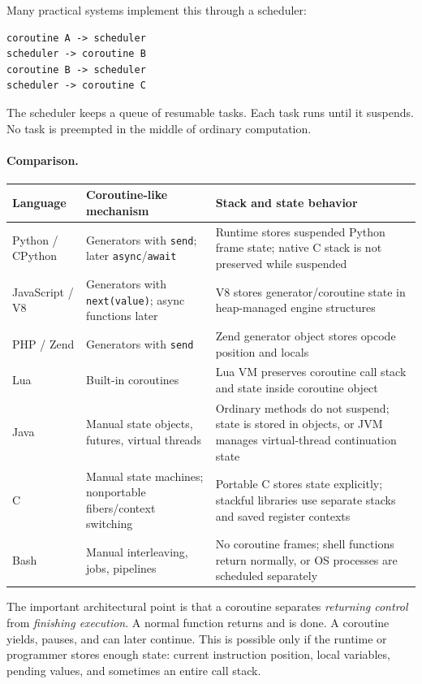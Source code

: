Many practical systems implement this through a scheduler:

\begin{verbatim}
coroutine A -> scheduler
scheduler -> coroutine B
coroutine B -> scheduler
scheduler -> coroutine C
\end{verbatim}

The scheduler keeps a queue of resumable tasks. Each task runs until it suspends. No task is preempted in the middle of ordinary computation.

\paragraph{Comparison.}

\begin{center}
\begin{tabular}{|p{}|p{}|p{}|}
\hline
\textbf{Language} & \textbf{Coroutine-like mechanism} & \textbf{Stack and state behavior} \\
\hline
Python / CPython & Generators with \texttt{send}; later \texttt{async}/\texttt{await} & Runtime stores suspended Python frame state; native C stack is not preserved while suspended \\
\hline
JavaScript / V8 & Generators with \texttt{next(value)}; async functions later & V8 stores generator/coroutine state in heap-managed engine structures \\
\hline
PHP / Zend & Generators with \texttt{send} & Zend generator object stores opcode position and locals \\
\hline
Lua & Built-in coroutines & Lua VM preserves coroutine call stack and state inside coroutine object \\
\hline
Java & Manual state objects, futures, virtual threads & Ordinary methods do not suspend; state is stored in objects, or JVM manages virtual-thread continuation state \\
\hline
C & Manual state machines; nonportable fibers/context switching & Portable C stores state explicitly; stackful libraries use separate stacks and saved register contexts \\
\hline
Bash & Manual interleaving, jobs, pipelines & No coroutine frames; shell functions return normally, or OS processes are scheduled separately \\
\hline
\end{tabular}
\end{center}

The important architectural point is that a coroutine separates \emph{returning control} from \emph{finishing execution}. A normal function returns and is done. A coroutine yields, pauses, and can later continue. This is possible only if the runtime or programmer stores enough state: current instruction position, local variables, pending values, and sometimes an entire call stack.

